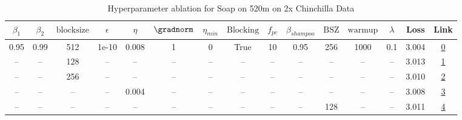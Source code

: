 \begin{table}[H]
\centering
\caption{Hyperparameter ablation for Soap on 520m on 2x Chinchilla Data}
\label{tab:ablation_soap_520m_on_2x_chinchilla_data}
\begin{tabular}{ccccccccccccccc}
\toprule
$\beta_1$ & $\beta_2$ & $\mathrm{block size}$ & $\epsilon$ & $\eta$ & $\gradnorm$ & $\eta_{min}$ & $\mathrm{Blocking}$ & $f_{pc}$ & $\beta_{shampoo}$ & $\mathrm{BSZ}$ & $\mathrm{warmup}$ & $\lambda$ & Loss & Link \\
\midrule
0.95 & 0.99 & 512 & 1e-10 & 0.008 & 1 & 0 & True & 10 & 0.95 & 256 & 1000 & 0.1 & 3.004 & \href{https://wandb.ai/stanford-mercury/optimizer-scaling/runs/sweep-520m-21B-soapea9baa74lr0.008-wd0.1-minlr0-warmup1000-b10.9-7994bc}{0} \\
\midrule
-- & -- & 128 & -- & -- & -- & -- & -- & -- & -- & -- & -- & -- & 3.013 & \href{https://wandb.ai/stanford-mercury/optimizer-scaling/runs/sweep-520m-21B-soapeaf56540lr0.008-wd0.1-minlr0-warmup1000-b10.9-f05b1f}{1} \\
-- & -- & 256 & -- & -- & -- & -- & -- & -- & -- & -- & -- & -- & 3.010 & \href{https://wandb.ai/stanford-mercury/optimizer-scaling/runs/sweep-520m-21B-soapea3d9681lr0.008-wd0.1-minlr0-warmup1000-b10.9-efedef}{2} \\
-- & -- & -- & -- & 0.004 & -- & -- & -- & -- & -- & -- & -- & -- & 3.008 & \href{https://wandb.ai/stanford-mercury/optimizer-scaling/runs/sweep-520m-21B-soapea5a76ddlr0.004-wd0.1-minlr0-warmup1000-b10.9-f115eb}{3} \\
-- & -- & -- & -- & -- & -- & -- & -- & -- & -- & 128 & -- & -- & 3.011 & \href{https://wandb.ai/stanford-mercury/optimizer-scaling/runs/sweep-520m-21B-soapeaef50b6lr0.008-wd0.1-minlr0-warmup1000-b10.9-8aed93}{4} \\
\bottomrule
\end{tabular}
\end{table}

